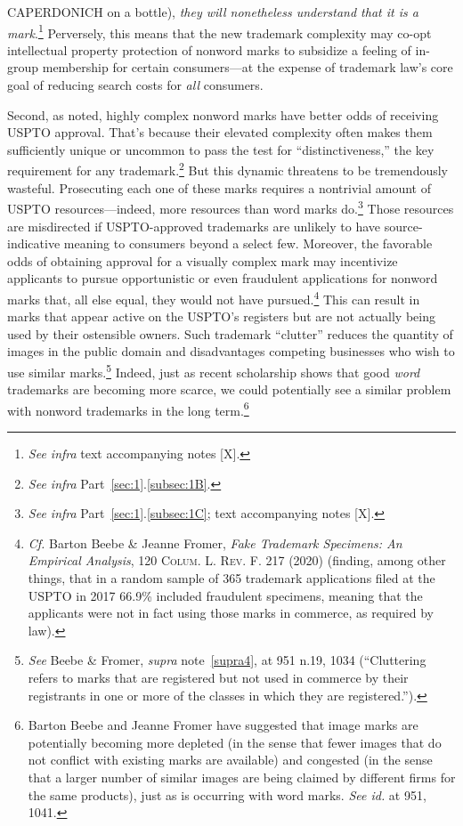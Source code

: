 \documentclass[letterpaper, 11pt, oneside]{article}
\begin{document}
CAPERDONICH on a bottle), \textit{they will nonetheless understand that it is a mark}.\footnote{\textit{See infra} text accompanying notes [X].} Perversely, this means that the new trademark complexity may co-opt intellectual property protection of nonword marks to subsidize a feeling of in-group membership for certain consumers—at the expense of trademark law's core goal of reducing search costs for \textit{all} consumers.

Second, as noted, highly complex nonword marks have better odds of receiving USPTO approval. That's because their elevated complexity often makes them sufficiently unique or uncommon to pass the test for ``distinctiveness,'' the key requirement for any trademark.\footnote{\textit{See infra} Part~\ref{sec:1}.\ref{subsec:1B}.} But this dynamic threatens to be tremendously wasteful. Prosecuting each one of these marks requires a nontrivial amount of USPTO resources—indeed, more resources than word marks do.\footnote{\textit{See infra} Part~\ref{sec:1}.\ref{subsec:1C}; text accompanying notes [X].} Those resources are misdirected if USPTO-approved trademarks are unlikely to have source-indicative meaning to consumers beyond a select few. Moreover, the favorable odds of obtaining approval for a visually complex mark may incentivize applicants to pursue opportunistic or even fraudulent applications for nonword marks that, all else equal, they would not have pursued.\footnote{\textit{Cf.} Barton Beebe \& Jeanne Fromer, \textit{Fake Trademark Specimens: An Empirical Analysis}, 120 \textsc{Colum. L. Rev. F.} 217 (2020) (finding, among other things, that in a random sample of 365 trademark applications filed at the USPTO in 2017 66.9\% included fraudulent specimens, meaning that the applicants were not in fact using those marks in commerce, as required by law).} This can result in marks that appear active on the USPTO's registers but are not actually being used by their ostensible owners. Such trademark ``clutter'' reduces the quantity of images in the public domain and disadvantages competing businesses who wish to use similar marks.\footnote{\textit{See} Beebe \& Fromer, \textit{supra} note~\ref{supra4}, at 951 n.19, 1034 (``Cluttering refers to marks that are registered but not used in commerce by their registrants in one or more of the classes in which they are registered.'').} Indeed, just as recent scholarship shows that good \textit{word} trademarks are becoming more scarce, we could potentially see a similar problem with nonword trademarks in the long term.\footnote{Barton Beebe and Jeanne Fromer have suggested that image marks are potentially becoming more depleted (in the sense that fewer images that do not conflict with existing marks are available) and congested (in the sense that a larger number of similar images are being claimed by different firms for the same products), just as is occurring with word marks. \textit{See id.} at 951, 1041.}
\end{document}
